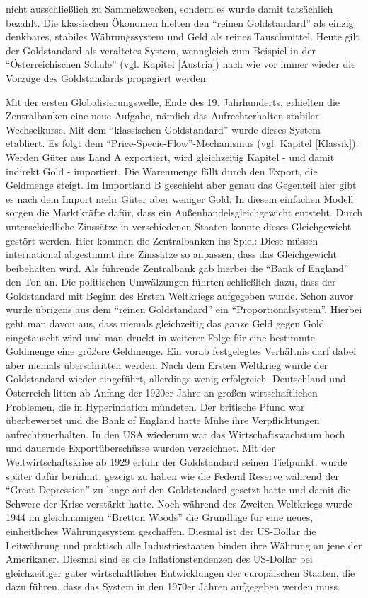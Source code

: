 nicht ausschließlich zu Sammelzwecken, sondern es wurde damit tatsächlich bezahlt. Die klassischen Ökonomen hielten den "`reinen Goldstandard"' als einzig denkbares, stabiles Währungssystem und Geld als reines Tauschmittel. Heute gilt der Goldstandard als veraltetes System, wenngleich zum Beispiel in der "`Österreichischen Schule"' (vgl. Kapitel \ref{Austria}) nach wie vor immer wieder die Vorzüge des Goldstandards propagiert werden.  

Mit der ersten Globalisierungswelle, Ende des 19. Jahrhunderts, erhielten die Zentralbanken eine neue Aufgabe, nämlich das Aufrechterhalten stabiler Wechselkurse. Mit dem "`klassischen Goldstandard"' wurde dieses System etabliert. Es folgt dem "`Price-Specie-Flow"'-Mechanismus (vgl. Kapitel \ref{Klassik}): Werden Güter aus Land A exportiert, wird gleichzeitig Kapitel - und damit indirekt Gold - importiert. Die Warenmenge fällt durch den Export, die Geldmenge steigt. Im Importland B geschieht aber genau das Gegenteil hier gibt es nach dem Import mehr Güter aber weniger Gold. In diesem einfachen Modell sorgen die Marktkräfte dafür, dass ein Außenhandelsgleichgewicht entsteht. Durch unterschiedliche Zinssätze in verschiedenen Staaten konnte dieses Gleichgewicht gestört werden. Hier kommen die Zentralbanken ins Spiel: Diese müssen international abgestimmt ihre Zinssätze so anpassen, dass das Gleichgewicht beibehalten wird. Als führende Zentralbank gab hierbei die "`Bank of England"' den Ton an. Die politischen Umwälzungen führten schließlich dazu, dass der Goldstandard mit Beginn des Ersten Weltkriegs aufgegeben wurde. Schon zuvor wurde übrigens aus dem "`reinen Goldstandard"' ein "`Proportionalsystem"'. Hierbei geht man davon aus, dass niemals gleichzeitig das ganze Geld gegen Gold eingetauscht wird und man druckt in weiterer Folge für eine bestimmte Goldmenge eine größere Geldmenge. Ein vorab festgelegtes Verhältnis darf dabei aber niemals überschritten werden. Nach dem Ersten Weltkrieg wurde der Goldstandard wieder eingeführt, allerdings wenig erfolgreich. Deutschland und Österreich litten ab Anfang der 1920er-Jahre an großen wirtschaftlichen Problemen, die in Hyperinflation mündeten. Der britische Pfund war überbewertet und die Bank of England hatte Mühe ihre Verpflichtungen aufrechtzuerhalten. In den USA wiederum war das Wirtschaftswachstum hoch und dauernde Exportüberschüsse wurden verzeichnet. Mit der Weltwirtschaftskrise ab 1929 erfuhr der Goldstandard seinen Tiefpunkt. \textcite{Friedman1963} wurde später dafür berühmt, gezeigt zu haben wie die Federal Reserve während der "`Great Depression"' zu lange auf den Goldstandard gesetzt hatte und damit die Schwere der Krise verstärkt hatte. Noch während des Zweiten Weltkriegs wurde 1944 im gleichnamigen "`Bretton Woods"' die Grundlage für eine neues, einheitliches Währungssystem geschaffen. Diesmal ist der US-Dollar die Leitwährung und praktisch alle Industriestaaten binden ihre Währung an jene der Amerikaner. Diesmal sind es die Inflationstendenzen des US-Dollar bei gleichzeitiger guter wirtschaftlicher Entwicklungen der europäischen Staaten, die dazu führen, dass das System in den 1970er Jahren aufgegeben werden muss.


